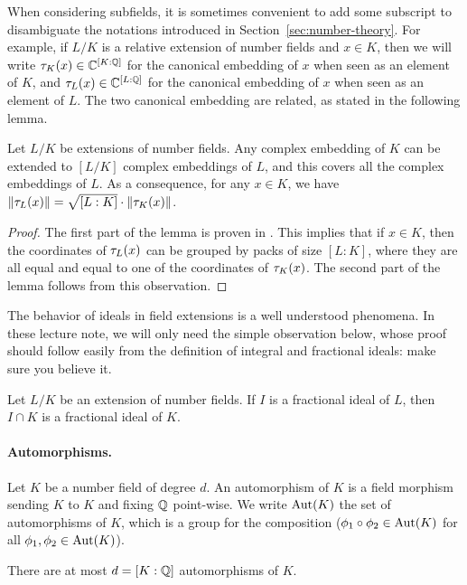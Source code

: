 When considering subfields, it is sometimes convenient to add some subscript to disambiguate the notations introduced in Section~\ref{sec:number-theory}. For example, if $L/K$ is a relative extension of number fields and $x \in K$, then we will write $\tau_K(x) \in \mathbb{C}^{[K:\mathbb{Q}]}$ for the canonical embedding of $x$ when seen as an element of $K$, and $\tau_L(x) \in \mathbb{C}^{[L:\mathbb{Q}]}$ for the canonical embedding of $x$ when seen as an element of $L$. The two canonical embedding are related, as stated in the following lemma.

\begin{lemma}
\label{lemma:canonical-norm-subfield}
Let $L/K$ be extensions of number fields. Any complex embedding of $K$ can be extended to $[L/K]$ complex embeddings of $L$, and this covers all the complex embeddings of $L$.
As a consequence, for any $x \in K$, we have $\|\tau_L(x)\| = \sqrt{[L:K]} \cdot \|\tau_K(x)\|$.
\end{lemma}

\begin{proof}
The first part of the lemma is proven in \cite[Th. 50]{Marcus}. This implies that if $x \in K$, then the coordinates of $\tau_L(x)$ can be grouped by packs of size $[L:K]$, where they are all equal and equal to one of the coordinates of $\tau_K(x)$. The second part of the lemma follows from this observation.
\end{proof}

The behavior of ideals in field extensions is a well understood phenomena. In these lecture note, we will only need the simple observation below, whose proof should follow easily from the definition of integral and fractional ideals: make sure you believe it.
\begin{lemma}
\label{lemma:intersection-ideal-subfield}
Let $L/K$ be an extension of number fields. If $I$ is a fractional ideal of $L$, then $I \cap K$ is a fractional ideal of $K$.
\end{lemma}


\paragraph{Automorphisms.} Let $K$ be a number field of degree $d$. An automorphism of $K$ is a field morphism sending $K$ to $K$ and fixing $\mathbb{Q}$ point-wise. We write $\operatorname{Aut}(K)$ the set of automorphisms of $K$, which is a group for the composition ($\phi_1 \circ \phi_2 \in \operatorname{Aut}(K)$ for all $\phi_1, \phi_2 \in \operatorname{Aut}(K)$).

\begin{lemma}
\label{lemma:upper-bound-automorphisms}
There are at most $d = [K:\mathbb{Q}]$ automorphisms of $K$.
\end{lemma}

